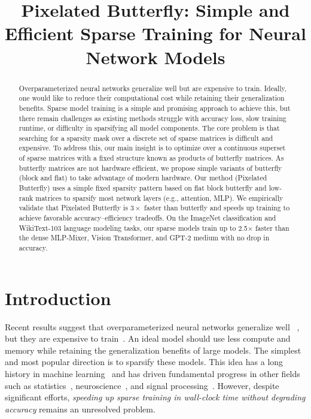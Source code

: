 \title{Pixelated Butterfly: Simple and Efficient Sparse Training for Neural Network Models}

\begin{abstract}
Overparameterized neural networks generalize well but are expensive to train. Ideally, one would like to reduce their computational cost while retaining their generalization benefits. Sparse model training is a simple and promising approach to achieve this, but there remain challenges as existing methods struggle with accuracy loss, slow training runtime, or difficulty in sparsifying all model components. The core problem is that searching for a sparsity mask over a discrete set of sparse matrices is difficult and expensive. To address this, our main insight is to optimize over a continuous superset of sparse matrices with a fixed structure known as products of butterfly matrices. As butterfly matrices are not hardware efficient, we propose simple variants of butterfly (block and flat) to take advantage of modern hardware. Our method (Pixelated Butterfly) uses a simple fixed sparsity pattern based on flat block butterfly and low-rank matrices to sparsify most network layers (e.g., attention, MLP). We empirically validate that Pixelated Butterfly is $3\times$ faster than butterfly and speeds up training to achieve favorable accuracy--efficiency tradeoffs. On the ImageNet classification and WikiText-103 language modeling tasks, our sparse models train up to 2.5$\times$ faster than the dense MLP-Mixer, Vision Transformer, and GPT-2 medium with no drop in accuracy.
\end{abstract}

\section{Introduction}
\label{sec:intro}

Recent results suggest that overparameterized neural networks generalize well ~\citep{belkin2019reconciling}, but they are expensive to train~\citep{kaplan2020scaling}. An ideal model should use less compute and memory while retaining the generalization benefits of large models. The simplest and most popular direction is to sparsify these models. This idea has a long history in machine learning~\citep{lecun1990optimal} and has driven fundamental progress in other fields such as statistics~\citep{tibshirani1996regression}, neuroscience~\citep{foldiak2003sparse}, and signal processing~\citep{candes2006stable}. However, despite significant efforts, {\em speeding up sparse training in wall-clock time without degrading accuracy} remains an unresolved problem.


